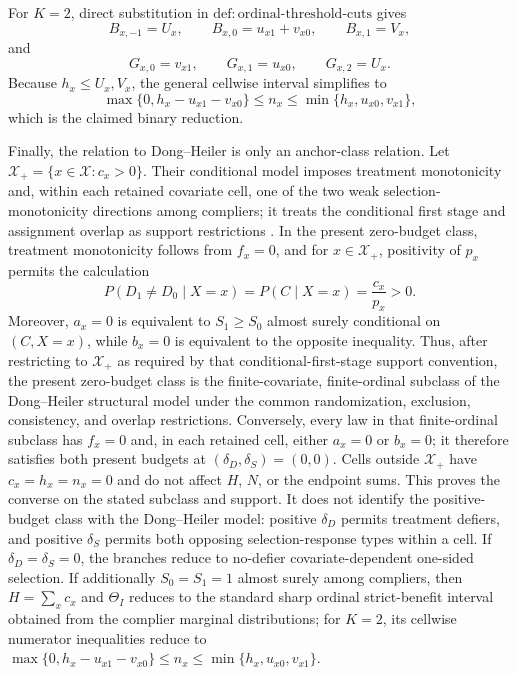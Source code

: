 For \(K=2\), direct substitution in \(\mathrm{def:ordinal\text{-}threshold\text{-}cuts}\) gives
\[
  B_{x,-1}=U_x,
  \qquad
  B_{x,0}=u_{x1}+v_{x0},
  \qquad
  B_{x,1}=V_x,
\]
and
\[
  G_{x,0}=v_{x1},
  \qquad
  G_{x,1}=u_{x0},
  \qquad
  G_{x,2}=U_x.
\]
Because \(h_x\leq U_x,V_x\), the general cellwise interval simplifies to
\[
  \max\{0,h_x-u_{x1}-v_{x0}\}
  \leq n_x\leq
  \min\{h_x,u_{x0},v_{x1}\},
\]
which is the claimed binary reduction.

Finally, the relation to Dong--Heiler is only an anchor-class relation.  Let \(\mathcal X_+=\{x\in\mathcal X:c_x>0\}\).  Their conditional model imposes treatment monotonicity and, within each retained covariate cell, one of the two weak selection-monotonicity directions among compliers; it treats the conditional first stage and assignment overlap as support restrictions \cite[Assumptions~3.1--3.2 and the discussion following Assumption~3.1]{DongHeiler2026}.  In the present zero-budget class, treatment monotonicity follows from \(f_x=0\), and for \(x\in\mathcal X_+\), positivity of \(p_x\) permits the calculation
\[
  P(D_1\neq D_0\mid X=x)
  =P(C\mid X=x)
  =\frac{c_x}{p_x}>0.
\]
Moreover, \(a_x=0\) is equivalent to \(S_1\geq S_0\) almost surely conditional on \((C,X=x)\), while \(b_x=0\) is equivalent to the opposite inequality.  Thus, after restricting to \(\mathcal X_+\) as required by that conditional-first-stage support convention, the present zero-budget class is the finite-covariate, finite-ordinal subclass of the Dong--Heiler structural model under the common randomization, exclusion, consistency, and overlap restrictions.  Conversely, every law in that finite-ordinal subclass has \(f_x=0\) and, in each retained cell, either \(a_x=0\) or \(b_x=0\); it therefore satisfies both present budgets at \((\delta_D,\delta_S)=(0,0)\).  Cells outside \(\mathcal X_+\) have \(c_x=h_x=n_x=0\) and do not affect \(H\), \(N\), or the endpoint sums.  This proves the converse on the stated subclass and support.  It does not identify the positive-budget class with the Dong--Heiler model: positive \(\delta_D\) permits treatment defiers, and positive \(\delta_S\) permits both opposing selection-response types within a cell.
If \(\delta_D=\delta_S=0\), the branches reduce to no-defier covariate-dependent one-sided selection. If additionally \(S_0=S_1=1\) almost surely among compliers, then \(H=\sum_xc_x\) and \(\Theta_I\) reduces to the standard sharp ordinal strict-benefit interval obtained from the complier marginal distributions; for \(K=2\), its cellwise numerator inequalities reduce to \(\max\{0,h_x-u_{x1}-v_{x0}\}\le n_x\le\min\{h_x,u_{x0},v_{x1}\}\).
